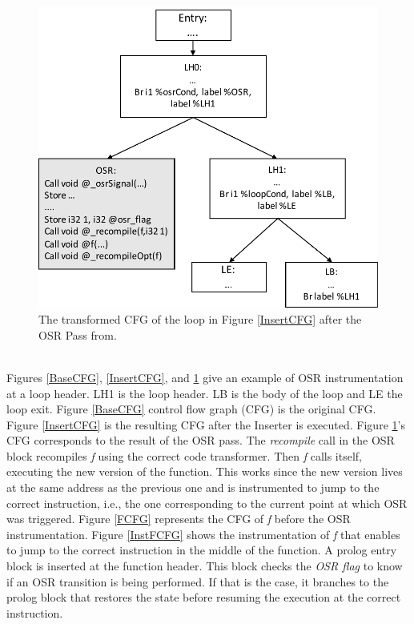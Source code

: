 \begin{figure}[h]
\centering
\includegraphics[scale=0.5]{Figures/OSRPassCFG}
\decoRule
\caption[The transformed CFG of the loop in Figure \ref{InsertCFG} after the OSR Pass]{The transformed CFG of the loop in Figure \ref{InsertCFG} after the OSR Pass from\cite{lameed2013modular}.}
\label{OSRPassCFG}
\end{figure}\\

Figures \ref{BaseCFG}, \ref{InsertCFG}, and \ref{OSRPassCFG} give an example of OSR instrumentation at a loop header.
LH1 is the loop header. 
LB is the body of the loop and LE the loop exit. 
Figure \ref{BaseCFG} control flow graph (CFG) is the original CFG. 
Figure \ref{InsertCFG} is the resulting CFG after the Inserter is executed.
Figure \ref{OSRPassCFG}'s CFG corresponds to the result of the OSR pass.
The \textit{recompile} call in the OSR block recompiles \textit{f} using the correct code transformer.
Then \textit{f} calls itself, executing the new version of the function.
This works since the new version lives at the same address as the previous one and is instrumented to jump to the correct instruction, i.e., the one corresponding to the current point at which OSR was triggered.
Figure \ref{FCFG} represents the CFG of \textit{f} before the OSR instrumentation.
Figure \ref{InstFCFG} shows the instrumentation of \textit{f} that enables to jump to the correct instruction in the middle of the function. 
A prolog entry block is inserted at the function header.
This block checks the \textit{OSR flag} to know if an OSR transition is being performed.
If that is the case, it branches to the prolog block that restores the state before resuming the execution at the correct instruction.\\

